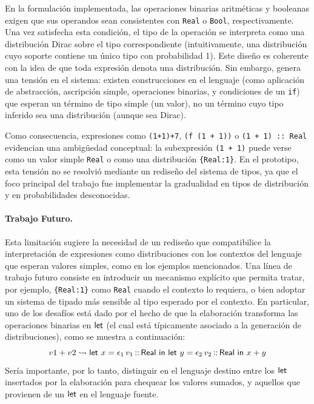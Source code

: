 En la formulación implementada, las operaciones binarias aritméticas y
booleanas exigen que sus operandos sean consistentes con
\lstinline|Real| o \lstinline|Bool|, respectivamente. Una vez
satisfecha esta condición, el tipo de la operación se interpreta como
una distribución Dirac sobre el tipo correspondiente (intuitivamente,
una distribución cuyo soporte contiene un único tipo con probabilidad
1). Este diseño es coherente con la idea de que toda expresión denota
una distribución. Sin embargo, genera una tensión en el sistema:
existen construcciones en el lenguaje (como aplicación de abstracción,
ascripción simple, operaciones binarias, y condiciones de un
\lstinline|if|) que esperan un término de tipo simple (un valor), no
un término cuyo tipo inferido sea una distribución (aunque sea Dirac).


Como consecuencia, expresiones como \lstinline|(1+1)+7|,
\lstinline|(f (1 + 1))| o \lstinline|(1 + 1) :: Real| evidencian una
ambigüedad conceptual: la subexpresión \lstinline|(1 + 1)| puede verse
como un valor simple \lstinline|Real| o como una distribución
\lstinline|{Real:1}|. En el prototipo, esta tensión no se resolvió
mediante un rediseño del sistema de tipos, ya que el foco principal
del trabajo fue implementar la gradualidad en tipos de distribución y
en probabilidades desconocidas.

\paragraph{Trabajo Futuro.}
Esta limitación sugiere la necesidad de un rediseño que compatibilice
la interpretación de expresiones como distribuciones con los
contextos del lenguaje que esperan valores simples, como en los
ejemplos mencionados. Una línea de trabajo futuro consiste en
introducir un mecanismo explícito que permita tratar, por ejemplo,
\lstinline|{Real:1}| como \lstinline|Real| cuando el contexto lo
requiera, o bien adoptar un sistema de tipado más sensible al tipo
esperado por el contexto. En particular, uno de los desafíos está dado
por el hecho de que la elaboración transforma las operaciones binarias
en $\mathop{\text{\sffamily let}}$ (el cual está típicamente asociado a la generación de
distribuciones), como se muestra a continuación:
\begin{equation*}
  v1 + v2  \mathrel{\leadsto} \text{\sffamily let } {x} = {\epsilon_1\, v_1 \mathop{\text{\sffamily ::}} \mathord{\text{\sffamily Real}}} \text{\sffamily { in }} {\text{\sffamily let } {y} = {\epsilon_2\, v_2 \mathop{\text{\sffamily ::}}\mathord{\text{\sffamily Real}}} \text{\sffamily { in }} {x+y}}
\end{equation*}
Sería importante, por lo tanto, distinguir
en el lenguaje destino entre los $\mathop{\text{\sffamily let}}$ insertados
por la elaboración para chequear los valores
sumados, y aquellos que provienen de un $\mathop{\text{\sffamily let}}$ en el
lenguaje fuente.


